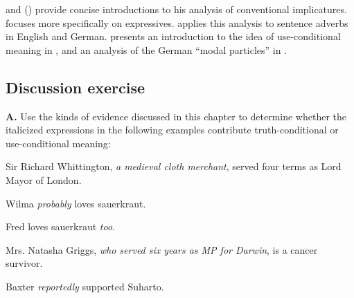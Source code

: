 \citet{Potts2007a,Potts2007b} and (\citeyear{Potts2012}) provide concise introductions to his analysis of conventional implicatures. \citet{Potts2007c} focuses more specifically on expressives. \citet{Scheffler2013} applies this analysis to sentence adverbs in English and German. \citet{Gutzman2015} presents an introduction to the idea of use-conditional meaning in , and an analysis of the German “modal particles” in .


\subsection*{Discussion exercise}\label{sec:}

\textbf{A.} Use the kinds of evidence discussed in this chapter to determine whether the italicized expressions in the following examples contribute truth-conditional or use-conditional meaning:

\ea \label{ex:11.}
\ea \label{ex:11.} Sir Richard Whittington, \textit{a medieval cloth merchant}, served four terms as Lord Mayor of London.

\ex Wilma \textit{probably} loves sauerkraut.

\ex Fred loves sauerkraut \textit{too}.

\ex Mrs. Natasha Griggs, \textit{who served six years as MP for Darwin}, is a cancer survivor.

\ex Baxter \textit{reportedly} supported Suharto.
\z
\z

